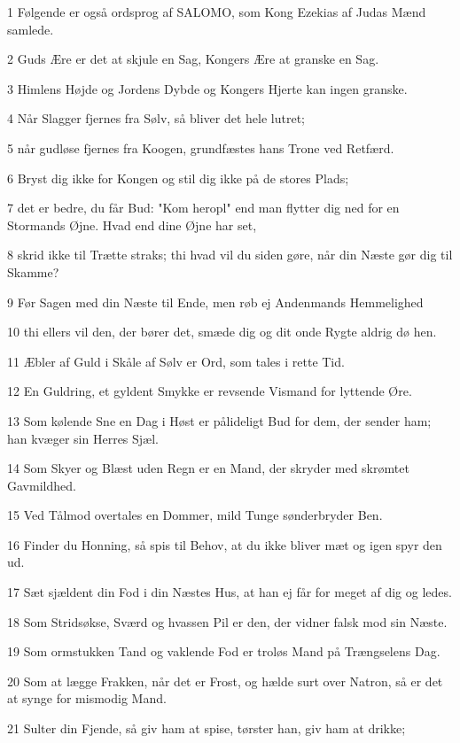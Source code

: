 \par 1 Følgende er også ordsprog af SALOMO, som Kong Ezekias af Judas Mænd samlede.
\par 2 Guds Ære er det at skjule en Sag, Kongers Ære at granske en Sag.
\par 3 Himlens Højde og Jordens Dybde og Kongers Hjerte kan ingen granske.
\par 4 Når Slagger fjernes fra Sølv, så bliver det hele lutret;
\par 5 når gudløse fjernes fra Koogen, grundfæstes hans Trone ved Retfærd.
\par 6 Bryst dig ikke for Kongen og stil dig ikke på de stores Plads;
\par 7 det er bedre, du får Bud: "Kom heropl" end man flytter dig ned for en Stormands Øjne. Hvad end dine Øjne har set,
\par 8 skrid ikke til Trætte straks; thi hvad vil du siden gøre, når din Næste gør dig til Skamme?
\par 9 Før Sagen med din Næste til Ende, men røb ej Andenmands Hemmelighed
\par 10 thi ellers vil den, der bører det, smæde dig og dit onde Rygte aldrig dø hen.
\par 11 Æbler af Guld i Skåle af Sølv er Ord, som tales i rette Tid.
\par 12 En Guldring, et gyldent Smykke er revsende Vismand for lyttende Øre.
\par 13 Som kølende Sne en Dag i Høst er pålideligt Bud for dem, der sender ham; han kvæger sin Herres Sjæl.
\par 14 Som Skyer og Blæst uden Regn er en Mand, der skryder med skrømtet Gavmildhed.
\par 15 Ved Tålmod overtales en Dommer, mild Tunge sønderbryder Ben.
\par 16 Finder du Honning, så spis til Behov, at du ikke bliver mæt og igen spyr den ud.
\par 17 Sæt sjældent din Fod i din Næstes Hus, at han ej får for meget af dig og ledes.
\par 18 Som Stridsøkse, Sværd og hvassen Pil er den, der vidner falsk mod sin Næste.
\par 19 Som ormstukken Tand og vaklende Fod er troløs Mand på Trængselens Dag.
\par 20 Som at lægge Frakken, når det er Frost, og hælde surt over Natron, så er det at synge for mismodig Mand.
\par 21 Sulter din Fjende, så giv ham at spise, tørster han, giv ham at drikke;

